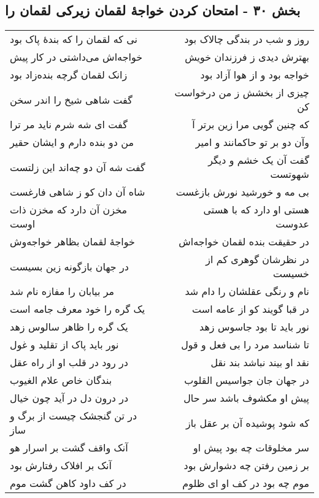 \begin{center}
\section*{بخش ۳۰ - امتحان کردن خواجهٔ لقمان زیرکی لقمان را}
\label{sec:sh030}
\begin{longtable}{l p{0.5cm} r}
نی که لقمان را که بندهٔ پاک بود
&&
روز و شب در بندگی چالاک بود
\\
خواجه‌اش می‌داشتی در کار پیش
&&
بهترش دیدی ز فرزندان خویش
\\
زانک لقمان گرچه بنده‌زاد بود
&&
خواجه بود و از هوا آزاد بود
\\
گفت شاهی شیخ را اندر سخن
&&
چیزی از بخشش ز من درخواست کن
\\
گفت ای شه شرم ناید مر ترا
&&
که چنین گویی مرا زین برتر آ
\\
من دو بنده دارم و ایشان حقیر
&&
وآن دو بر تو حاکمانند و امیر
\\
گفت شه آن دو چه‌اند این زلتست
&&
گفت آن یک خشم و دیگر شهوتست
\\
شاه آن دان کو ز شاهی فارغست
&&
بی مه و خورشید نورش بازغست
\\
مخزن آن دارد که مخزن ذات اوست
&&
هستی او دارد که با هستی عدوست
\\
خواجهٔ لقمان بظاهر خواجه‌وش
&&
در حقیقت بنده لقمان خواجه‌اش
\\
در جهان بازگونه زین بسیست
&&
در نظرشان گوهری کم از خسیست
\\
مر بیابان را مفازه نام شد
&&
نام و رنگی عقلشان را دام شد
\\
یک گره را خود معرف جامه است
&&
در قبا گویند کو از عامه است
\\
یک گره را ظاهر سالوس زهد
&&
نور باید تا بود جاسوس زهد
\\
نور باید پاک از تقلید و غول
&&
تا شناسد مرد را بی فعل و قول
\\
در رود در قلب او از راه عقل
&&
نقد او بیند نباشد بند نقل
\\
بندگان خاص علام الغیوب
&&
در جهان جان جواسیس القلوب
\\
در درون دل در آید چون خیال
&&
پیش او مکشوف باشد سر حال
\\
در تن گنجشک چیست از برگ و ساز
&&
که شود پوشیده آن بر عقل باز
\\
آنک واقف گشت بر اسرار هو
&&
سر مخلوقات چه بود پیش او
\\
آنک بر افلاک رفتارش بود
&&
بر زمین رفتن چه دشوارش بود
\\
در کف داود کاهن گشت موم
&&
موم چه بود در کف او ای ظلوم
\\

\end{longtable}
\end{center}
